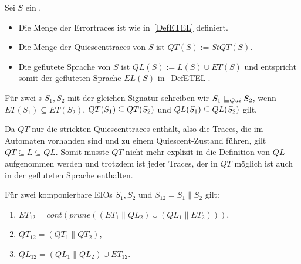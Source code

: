 \begin{Def}
  \label{DefQTQL}
  Sei $S$ ein \EIO{}.
  \begin{itemize}
    \item Die Menge der Errortraces ist wie in~\ref{DefETEL} definiert.
    \item Die Menge der Quiescenttraces von $S$ ist $QT(S) := StQT(S)$.
    \item Die geflutete Sprache von $S$ ist $QL(S):=L(S)\cup ET(S)$
      und entspricht somit der gefluteten Sprache $EL(S)$
      in~\ref{DefETEL}.
  \end{itemize}
  Für zwei \EIO{}s $S_1, S_2$ mit der gleichen Signatur schreiben wir
  $S_1\sqsubseteq _{Qui} S_2$, wenn $ET(S_1)\subseteq ET(S_2)$,
  $QT{}(S_1)\subseteq QT{}(S_2)$ und $QL{}(S_1)\subseteq QL{}(S_2)$ gilt.
\end{Def}

Da $QT$ nur die strickten Quiescenttraces enthält, also die Traces, die im
Automaten vorhanden sind und zu einem Quiescent-Zustand führen, gilt
$QT\subseteq L\subseteq QL$. Somit musste $QT$ nicht mehr explizit in die
Definition von $QL$ aufgenommen werden und trotzdem ist jeder Traces, der in
$QT$ möglich ist auch in der gefluteten Sprache enthalten.

\begin{satz}
  \label{satzQuiSemantik}
  Für zwei komponierbare EIOs $S_1, S_2$ und $S_{12} = S_1\|S_2$ gilt:
  \begin{enumerate}
    \item $ET_{12} = cont(prune((ET_1\|QL_2)\cup (QL_1\|ET_2)))$,
    \item $QT_{12} = (QT_1\|QT_2)$,%
    \item $QL_{12} = (QL_1\|QL_2)\cup ET_{12}$.%
  \end{enumerate}
\end{satz}

